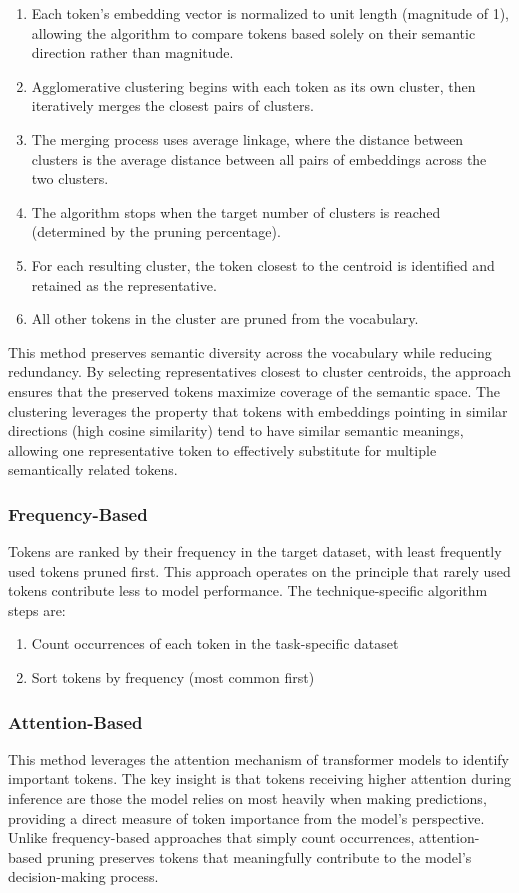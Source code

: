 \documentclass[twocolumn]{article}
\begin{document}
\begin{enumerate}
    \item Each token's embedding vector is normalized to unit length (magnitude of 1), allowing the algorithm to compare tokens based solely on their semantic direction rather than magnitude.
    \item Agglomerative clustering begins with each token as its own cluster, then iteratively merges the closest pairs of clusters.
    \item The merging process uses average linkage, where the distance between clusters is the average distance between all pairs of embeddings across the two clusters.
    \item The algorithm stops when the target number of clusters is reached (determined by the pruning percentage).
    \item For each resulting cluster, the token closest to the centroid is identified and retained as the representative.
    \item All other tokens in the cluster are pruned from the vocabulary.
\end{enumerate}
This method preserves semantic diversity across the vocabulary while reducing redundancy. By selecting representatives closest to cluster centroids, the approach ensures that the preserved tokens maximize coverage of the semantic space. The clustering leverages the property that tokens with embeddings pointing in similar directions (high cosine similarity) tend to have similar semantic meanings, allowing one representative token to effectively substitute for multiple semantically related tokens.

\subsubsection{Frequency-Based}
Tokens are ranked by their frequency in the target dataset, with least frequently used tokens pruned first. This approach operates on the principle that rarely used tokens contribute less to model performance. The technique-specific algorithm steps are:

\begin{enumerate}
    \item Count occurrences of each token in the task-specific dataset
    \item Sort tokens by frequency (most common first)
\end{enumerate}
\subsubsection{Attention-Based}
This method leverages the attention mechanism of transformer models to identify important tokens. The key insight is that tokens receiving higher attention during inference are those the model relies on most heavily when making predictions, providing a direct measure of token importance from the model's perspective. Unlike frequency-based approaches that simply count occurrences, attention-based pruning preserves tokens that meaningfully contribute to the model's decision-making process.
\end{document}
